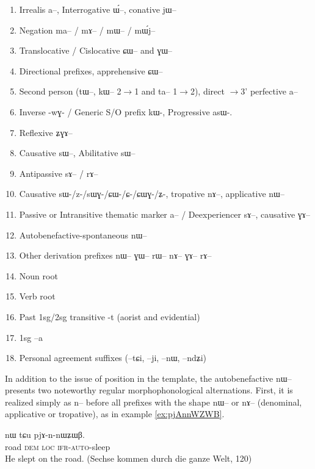 \documentclass[oldfontcommands,oneside,a4paper,11pt]{article}
\newcommand{\ipa}[1]{{\phon \mbox{#1}}} %
\begin{document}
\begin{landscape}
\begin{multicols}{2}
\begin{enumerate}
\item Irrealis  \ipa{a}--, Interrogative \ipa{ɯ́}--, conative \ipa{jɯ}--
\item Negation \ipa{ma}-- / \ipa{mɤ}-- / \ipa{mɯ}-- / \ipa{mɯ́j}--
\item Translocative / Cislocative \ipa{ɕɯ}-- and \ipa{ɣɯ}--
\item Directional prefixes, apprehensive \ipa{ɕɯ}--
\item Second person (\ipa{tɯ}--, \ipa{kɯ}-- 2$\rightarrow$1 and  \ipa{ta--} 1$\rightarrow$2), direct $\rightarrow$3' perfective \ipa{a--}
\item Inverse -\ipa{wɣ}- / Generic S/O prefix \ipa{kɯ}-, Progressive \ipa{asɯ}-. 
\item Reflexive \ipa{ʑɣɤ}-- 
\item Causative \ipa{sɯ}--, Abilitative \ipa{sɯ}--
\item  Antipassive  \ipa{sɤ}-- / \ipa{rɤ}--
\item Causative \ipa{sɯ-/z-/sɯɣ-/ɕɯ-/ɕ-/ɕɯɣ-/ʑ-}, tropative \ipa{nɤ}--, applicative \ipa{nɯ}--
\item Passive or Intransitive thematic marker \ipa{a}-- / Deexperiencer \ipa{sɤ}--, causative \ipa{ɣɤ--}
\item Autobenefactive-spontaneous \ipa{nɯ}--
\item Other derivation prefixes \ipa{nɯ}-- \ipa{ɣɯ}-- \ipa{rɯ}-- \ipa{nɤ}-- \ipa{ɣɤ}-- \ipa{rɤ}--
\item Noun root
\item Verb root 
\item Past 1sg/2sg transitive -\ipa{t} (aorist and evidential)
\item 1sg --\ipa{a}
\item Personal agreement suffixes (--\ipa{tɕi}, --\ipa{ji}, --\ipa{nɯ}, --\ipa{ndʑi})
\end{enumerate}


\end{multicols}
  \end{landscape}
 
 
In addition to the issue of position in the template, the autobenefactive \ipa{nɯ--} presents two noteworthy regular morphophonological alternations. First, it is realized simply as \ipa{n--} before all prefixes with the shape \ipa{nɯ--} or \ipa{nɤ--} (denominal, applicative or tropative), as in example \ref{ex:pjAnnWZWB}.
 
 \begin{exe}
\ex \label{ex:pjAnnWZWB}
\gll  \ipa{tʂu} 	\ipa{nɯ} \ipa{tɕu} \ipa{pjɤ-n-nɯʑɯβ.} \\
road \textsc{dem} \textsc{loc} \textsc{ifr-auto}-sleep \\
\glt He slept on the road. (Sechse kommen durch die ganze Welt, 120)
\end{exe}
\end{document}
